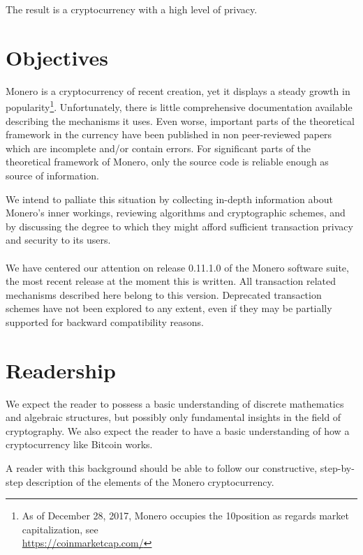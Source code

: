 The result is a cryptocurrency with a high level of privacy.





\section{Objectives}
\label{sec:goals}

Monero is a cryptocurrency of recent creation, yet it displays a steady growth in popularity\footnote{
As of December 28\nth, 2017, Monero occupies the 10\nth position as regards market capitalization, see\\ \url{https://coinmarketcap.com/}}. 
Unfortunately, there is little comprehensive documentation available describing the mechanisms it uses. 
Even worse, important parts of the theoretical framework in the currency have been published
in non peer-reviewed papers which are incomplete and/or contain errors.
For significant parts of the theoretical framework of Monero, only the source code is reliable enough as source
of information.
  
We intend to palliate this situation by collecting in-depth information about Monero's inner workings, 
reviewing algorithms and cryptographic schemes, and by discussing the degree to which they might afford sufficient 
transaction privacy and security to its users.
\\ 
\\ 

We have centered our attention on release 0.11.1.0 of the Monero software suite,
the most recent release at the moment this is written.
All transaction related mechanisms described here belong to this version. 
Deprecated transaction schemes have not been explored to any extent, even if they may
be partially supported for backward compatibility reasons.


\section{Readership}

We expect the reader to possess a basic understanding of discrete mathematics and algebraic structures, but possibly only
fundamental insights in the field of cryptography.
We also expect the reader to have a basic understanding of how a cryptocurrency like Bitcoin works.

A reader with this background should be able to follow our constructive, step-by-step description of the elements of the Monero cryptocurrency.

